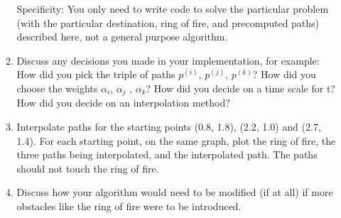 \documentclass[conference,onecolumn]{IEEEtran}
\begin{document}
\begin{enumerate}[label=\arabic{enumi}.]
\begin{enumerate}
                    Specificity: You only need to write code to solve the particular problem (with the particular destination, ring of ﬁre, and precomputed paths) described here, not a general purpose algorithm.
              \item Discuss any decisions you made in your implementation, for example: How did you pick the triple of paths $p^{(i)}$, $p^{(j)}$, $p^{(k)}$?
                    How did you choose the weights $\alpha_i$, $\alpha_j$ , $\alpha_k$?
                    How did you decide on a time scale for t?
                    How did you decide on an interpolation method?
              \item Interpolate paths for the starting points (0.8, 1.8), (2.2, 1.0) and (2.7, 1.4).
                    For each starting point, on the same graph, plot the ring of fire, the three paths being interpolated, and the interpolated path.
                    The paths should not touch the ring of fire.
              \item Discuss how your algorithm would need to be modified (if at all) if more obstacles like the ring of fire were to be introduced.
          \end{enumerate}
\end{enumerate}
\end{document}
